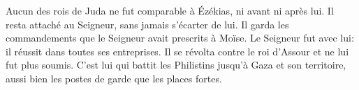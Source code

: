 Aucun des rois de Juda ne fut comparable à Ézékias, ni avant ni après lui.
Il resta attaché au Seigneur, sans jamais s’écarter de lui.
	Il garda les commandements que le Seigneur avait prescrits à Moïse.
Le Seigneur fut avec lui: il réussit dans toutes ses entreprises.
	Il se révolta contre le roi d’Assour et ne lui fut plus soumis.
C’est lui qui battit les Philistins jusqu’à Gaza et son territoire,
	aussi bien les postes de garde que les places fortes.
